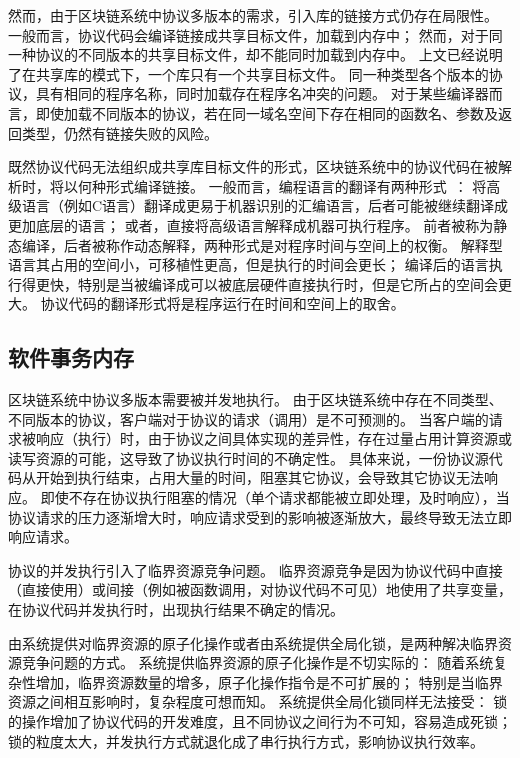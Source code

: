 然而，由于区块链系统中协议多版本的需求，引入库的链接方式仍存在局限性。
一般而言，协议代码会编译链接成共享目标文件，加载到内存中；
然而，对于同一种协议的不同版本的共享目标文件，却不能同时加载到内存中。
上文已经说明了在共享库的模式下，一个库只有一个共享目标文件。
同一种类型各个版本的协议，具有相同的程序名称，同时加载存在程序名冲突的问题。
对于某些编译器而言，即使加载不同版本的协议，若在同一域名空间下存在相同的函数名、参数及返回类型，仍然有链接失败的风险。

既然协议代码无法组织成共享库目标文件的形式，区块链系统中的协议代码在被解析时，将以何种形式编译链接。
一般而言，编程语言的翻译有两种形式~\cite{aycock2003brief}：
将高级语言（例如C语言）翻译成更易于机器识别的汇编语言，后者可能被继续翻译成更加底层的语言；
或者，直接将高级语言解释成机器可执行程序。
前者被称为静态编译，后者被称作动态解释，两种形式是对程序时间与空间上的权衡。
解释型语言其占用的空间小，可移植性更高，但是执行的时间会更长；
编译后的语言执行得更快，特别是当被编译成可以被底层硬件直接执行时，但是它所占的空间会更大。
协议代码的翻译形式将是程序运行在时间和空间上的取舍。

\subsection{软件事务内存}

区块链系统中协议多版本需要被并发地执行。
由于区块链系统中存在不同类型、不同版本的协议，客户端对于协议的请求（调用）是不可预测的。
当客户端的请求被响应（执行）时，由于协议之间具体实现的差异性，存在过量占用计算资源或读写资源的可能，这导致了协议执行时间的不确定性。
具体来说，一份协议源代码从开始到执行结束，占用大量的时间，阻塞其它协议，会导致其它协议无法响应。
即使不存在协议执行阻塞的情况（单个请求都能被立即处理，及时响应），当协议请求的压力逐渐增大时，响应请求受到的影响被逐渐放大，最终导致无法立即响应请求。

协议的并发执行引入了临界资源竞争问题。
临界资源竞争是因为协议代码中直接（直接使用）或间接（例如被函数调用，对协议代码不可见）地使用了共享变量，在协议代码并发执行时，出现执行结果不确定的情况。

由系统提供对临界资源的原子化操作或者由系统提供全局化锁，是两种解决临界资源竞争问题的方式。
系统提供临界资源的原子化操作是不切实际的：
随着系统复杂性增加，临界资源数量的增多，原子化操作指令是不可扩展的；
特别是当临界资源之间相互影响时，复杂程度可想而知。
系统提供全局化锁同样无法接受：
锁的操作增加了协议代码的开发难度，且不同协议之间行为不可知，容易造成死锁；
锁的粒度太大，并发执行方式就退化成了串行执行方式，影响协议执行效率。
